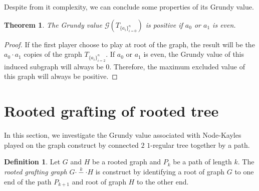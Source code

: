\documentclass[12pt]{elsarticle}
\newtheorem{theorem}{Theorem}[section]
\newtheorem*{theorem A}{Theorem A}
\newtheorem*{theorem B}{N\"olker's Theorem}
\theoremstyle{remark}
\theoremstyle{remark}
\theoremstyle{definition}
\newtheorem{definition}{Definition}
\begin{document}
Despite from it complexity, we can conclude some properties of its Grundy value.
\begin{theorem}
	The Grundy value $\mathcal{G}\left(T_{\{a_i\}_{i=0}^{n}}\right)$ is positive if $a_0$ or $a_1$ is even.
\end{theorem}
\begin{proof}
	If the first player choose to play at root of the graph, the result will be the $a_0\cdot a_1$ copies of the graph $T_{\{a_i\}_{i=2}^{n}}$. If $a_0$ or $a_1$ is even, the Grundy value of this induced subgraph will always be $0$. Therefore, the maximum excluded value of this graph will always be positive.
\end{proof}
\section{Rooted grafting of rooted tree}\label{sec3}
In this section, we investigate the Grundy value associated with Node-Kayles played on the graph construct by connected $2$ $1$-regular tree together by a path. 
\begin{definition}
	Let $G$ and $H$ be a rooted graph and $P_{k}$ be a path of length $k$. The \textit{rooted grafting graph} $G \stackrel{k}{\cdot - \cdot} H$ is construct by identifying a root of graph $G$ to one end of the path $P_{k+1}$ and root of graph $H$ to the other end.
\end{definition}
\end{document}
